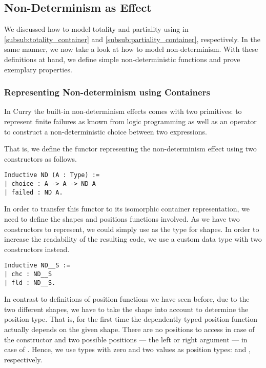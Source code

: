 \subsection{Non-Determinism as Effect}

We discussed how to model totality and partiality using  in \autoref{subsub:totality_container} and \autoref{subsub:partiality_container}, respectively.
In the same manner, we now take a look at how to model non-determinism.
With these definitions at hand, we define simple non-deterministic functions and prove exemplary properties.

\subsubsection{Representing Non-determinism using Containers}
In Curry the built-in non-determinism effects comes with two primitives:  to represent finite failures as known from logic programming as well as an operator  to construct a non-deterministic choice between two expressions.

That is, we define the functor representing the non-determinism effect using two constructors as follows. 

\begin{verbatim}
Inductive ND (A : Type) :=
| choice : A -> A -> ND A
| failed : ND A.
\end{verbatim}

In order to transfer this functor to its isomorphic container representation, we need to define the shapes and positions functions involved.
As we have two constructors to represent, we could simply use  as the type for shapes.
In order to increase the readability of the resulting code, we use a custom data type with two constructors instead.

\begin{verbatim}
Inductive ND__S :=
| chc : ND__S
| fld : ND__S.
\end{verbatim}

In contrast to definitions of position functions we have seen before, due to the two different shapes, we have to take the shape into account to determine the position type.
That is, for the first time the dependently typed position function actually depends on the given shape.
There are no positions to access in case of the  constructor and two possible positions --- the left or right argument --- in case of .
Hence, we use types with zero and two values as position types:  and , respectively.

